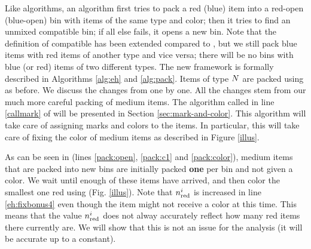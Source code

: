 Like {\SuperH} algorithms, an {\EHarm} algorithm first tries to pack a red (blue) 
item into a red-open (blue-open) bin with items of the same type and color; then it tries to find an unmixed compatible bin; if all else fails, it opens a new bin. 
Note that the definition of compatible has been extended compared to {\SuperH},
but we still pack blue items with red items of another type and vice versa;
there will be no bins with blue (or red) items of two different types.
The new framework is formally described in Algorithms \ref{alg:eh} and \ref{alg:pack}.
Items of type $N$ are packed using \nf{} as before.
We discuss the changes from {\SuperH} one by one. 
All the changes stem from our much more careful packing of medium items.
The algorithm {\MarkItems} called in line \ref{callmark} of {\EHarm} will be presented in Section \ref{sec:mark-and-color}.
This algorithm will take care of assigning marks and colors to the items. In particular, this will take care of fixing the color of medium items as described in Figure \ref{illus}.


As can be seen in {\Pack} (lines \ref{pack:open}, \ref{pack:c1} and \ref{pack:color}), medium items that are packed into new bins are initially packed \textbf{one} per bin and not given a color.
We wait until enough of these items have arrived, and then color the smallest one red using
{\MarkItems} (Fig. \ref{illus}). 
Note that $n_{\mathrm{red}}^i$ is increased in line \ref{eh:fixbonus4} even though the item might not receive a color at this time.
This means that the value $n_{\mathrm{red}}^i$ does not alway accurately reflect how many red items there currently are.
We will show that this is not an issue for the analysis (it will be accurate up to a constant).

